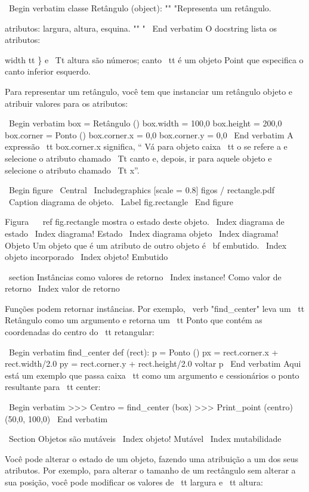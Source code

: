\documentclass[10pt]{book}
\begin{document}
\begin {itemize}
{{{{{{{{{{{{\ Begin {verbatim}
classe Retângulo (object):
    "" "Representa um retângulo. 

    atributos: largura, altura, esquina.
    "" "
\ End {verbatim}
%
O docstring lista os atributos: {width tt \} e
{\ Tt altura} são números; {canto \ tt} é um objeto Point que
especifica o canto inferior esquerdo.

Para representar um retângulo, você tem que instanciar um retângulo
objeto e atribuir valores para os atributos:

\ Begin {verbatim}
box = Retângulo ()
box.width = 100,0
box.height = 200,0
box.corner = Ponto ()
box.corner.x = 0,0
box.corner.y = 0,0
\ End {verbatim}
%
A expressão {\ tt box.corner.x} significa,
`` Vá para objeto {caixa \ tt} o se refere a e selecione o atributo chamado
{\ Tt canto} e, depois, ir para aquele objeto e selecione o atributo chamado
{\ Tt x}''.

\ Begin {figure}
\ Central
{\ Includegraphics [scale = 0.8] {figos / rectangle.pdf}}
\ Caption {diagrama de objeto.}
\ Label {} fig.rectangle
\ End {figure}


Figura ~ \ ref {} fig.rectangle mostra o estado deste objeto.
\ Index {diagrama de estado}
\ Index {diagrama! Estado}
\ Index {diagrama objeto}
\ Index {diagrama! Objeto}
Um objeto que é um atributo de outro objeto é {\ bf embutido}.
\ Index {objeto incorporado}
\ Index {objeto! Embutido}


\ section {Instâncias como valores de retorno}
\ Index {instance! Como valor de retorno}
\ Index {valor de retorno}

Funções podem retornar instâncias. Por exemplo, \ verb "find_center"
leva um {\ tt Retângulo} como um argumento e retorna um {\ tt Ponto}
que contém as coordenadas do centro do {\ tt retangular}:

\ Begin {verbatim}
find_center def (rect):
    p = Ponto ()
    px = rect.corner.x + rect.width/2.0
    py = rect.corner.y + rect.height/2.0
    voltar p
\ End {verbatim}
%
Aqui está um exemplo que passa {caixa \ tt} como um argumento e cessionários
o ponto resultante para {\ tt center}:

\ Begin {verbatim}
>>> Centro = find_center (box)
>>> Print_point (centro)
(50,0, 100,0)
\ End {verbatim}
%

\ Section {Objetos são mutáveis}
\ Index {objeto! Mutável}
\ Index {} mutabilidade

Você pode alterar o estado de um objeto, fazendo uma atribuição a um dos
seus atributos. Por exemplo, para alterar o tamanho de um rectângulo
sem alterar a sua posição, você pode modificar os valores de {\ tt
largura} e {\ tt altura}:

}}}}}}}}}}}}}
\end{itemize}
\end{document}
